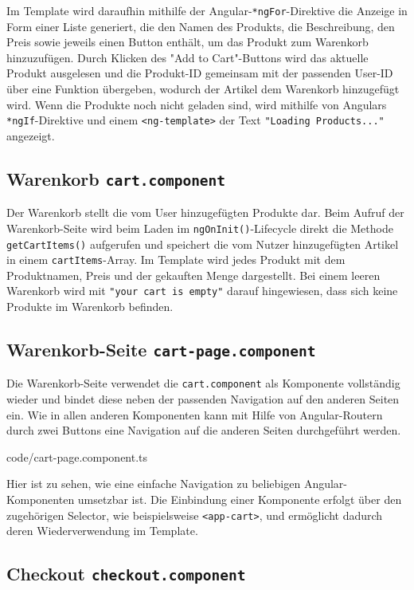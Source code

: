 \documentclass[oneside]{ausarbeitung}
\begin{document}
Im Template wird daraufhin mithilfe der Angular-\texttt{*ngFor}-Direktive die Anzeige in Form einer Liste generiert, die den Namen des Produkts, die Beschreibung, den Preis sowie jeweils einen Button enthält, um das Produkt zum Warenkorb hinzuzufügen.
Durch Klicken des "Add to Cart"-Buttons wird das aktuelle Produkt ausgelesen und die Produkt-ID gemeinsam mit der passenden User-ID über eine Funktion übergeben, wodurch der Artikel dem Warenkorb hinzugefügt wird.
Wenn die Produkte noch nicht geladen sind, wird mithilfe von Angulars \texttt{*ngIf}-Direktive und einem \texttt{<ng-template>} der Text \texttt{"Loading Products..."} angezeigt.


\subsection{Warenkorb \texttt{cart.component}}

Der Warenkorb stellt die vom User hinzugefügten Produkte dar. Beim Aufruf der Warenkorb-Seite wird beim Laden im \texttt{ngOnInit()}-Lifecycle direkt die Methode \texttt{getCartItems()} aufgerufen und speichert die vom Nutzer hinzugefügten Artikel in einem \texttt{cartItems}-Array. Im Template wird jedes Produkt mit dem Produktnamen, Preis und der gekauften Menge dargestellt. Bei einem leeren Warenkorb wird mit \texttt{"your cart is empty"} darauf hingewiesen, dass sich keine Produkte im Warenkorb befinden.

\subsection{Warenkorb-Seite \texttt{cart-page.component}}

Die Warenkorb-Seite verwendet die \texttt{cart.component} als Komponente vollständig wieder und bindet diese neben der passenden Navigation auf den anderen Seiten ein. Wie in allen anderen Komponenten kann mit Hilfe von Angular-Routern durch zwei Buttons eine Navigation auf die anderen Seiten durchgeführt werden.

 {code/cart-page.component.ts}

Hier ist zu sehen, wie eine einfache Navigation zu beliebigen Angular-Komponenten umsetzbar ist. Die Einbindung einer Komponente erfolgt über den zugehörigen Selector, wie beispielsweise \texttt{<app-cart>}, und ermöglicht dadurch deren Wiederverwendung im Template.

\subsection{Checkout \texttt{checkout.component}}
\end{document}
